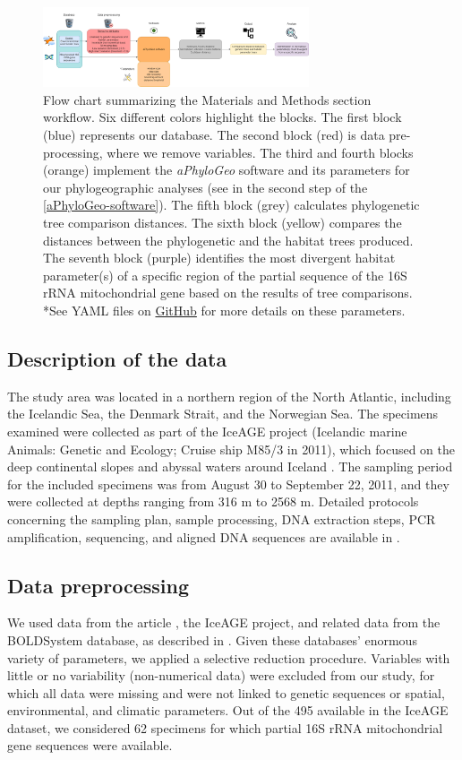 \begin{figure}[htbp]
    \centering
    \includegraphics[width=0.7\textwidth]{diagram.drawio.png}
    \caption{Flow chart summarizing the Materials and Methods section workflow. Six different colors highlight the blocks. The first block (blue) represents our database. The second block (red) is data pre-processing, where we remove variables. The third and fourth blocks (orange) implement the \textit{aPhyloGeo} software and its parameters for our phylogeographic analyses (see in the second step of the \autoref{aPhyloGeo-software}). The fifth block (grey) calculates phylogenetic tree comparison distances. The sixth block (yellow) compares the distances between the phylogenetic and the habitat trees produced. The seventh block (purple) identifies the most divergent habitat parameter(s) of a specific region of the partial sequence of the 16S rRNA mitochondrial gene based on the results of tree comparisons. *See YAML files on \href{https://github.com/tahiri-lab/aPhyloGeo}{GitHub} for more details on these parameters. \label{fig:fig1}}
\end{figure}

\subsection{Description of the data}
The study area was located in a northern region of the North Atlantic, including the Icelandic Sea, the Denmark Strait, and the Norwegian Sea. The specimens examined were collected as part of the IceAGE project (Icelandic marine Animals: Genetic and Ecology; Cruise ship M85/3 in 2011), which focused on the deep continental slopes and abyssal waters around Iceland \citep{meisner_prefacebiodiversity_2018}. The sampling period for the included specimens was from August 30 to September 22, 2011, and they were collected at depths ranging from 316 m to 2568 m. Detailed protocols concerning the sampling plan, sample processing, DNA extraction steps, PCR amplification, sequencing, and aligned DNA sequences are available in \citep{uhlir_adding_2021}.

\subsection{Data preprocessing}
We used data from the article \citep{uhlir_adding_2021}, the IceAGE project, and related data from the BOLDSystem database, as described in \citep{uhlir_adding_2021}. Given these databases' enormous variety of parameters, we applied a selective reduction procedure. Variables with little or no variability (non-numerical data) were excluded from our study, for which all data were missing and were not linked to genetic sequences or spatial, environmental, and climatic parameters. Out of the 495 available in the IceAGE dataset, we considered 62 specimens for which partial 16S rRNA mitochondrial gene sequences were available.

